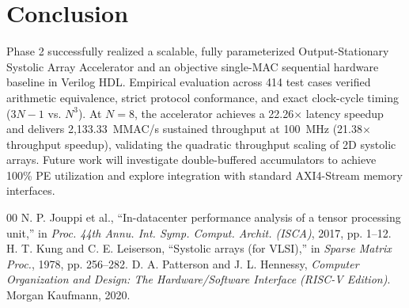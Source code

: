 \documentclass[conference]{IEEEtran}
\begin{document}
\section{Conclusion}
Phase 2 successfully realized a scalable, fully parameterized Output-Stationary Systolic Array Accelerator and an objective single-MAC sequential hardware baseline in Verilog HDL. Empirical evaluation across 414 test cases verified arithmetic equivalence, strict protocol conformance, and exact clock-cycle timing ($3N-1$ vs. $N^3$). At $N=8$, the accelerator achieves a 22.26$\times$ latency speedup and delivers 2,133.33~MMAC/s sustained throughput at 100~MHz (21.38$\times$ throughput speedup), validating the quadratic throughput scaling of 2D systolic arrays. Future work will investigate double-buffered accumulators to achieve 100\% PE utilization and explore integration with standard AXI4-Stream memory interfaces.

\begin{thebibliography}{00}
 N. P. Jouppi et al., ``In-datacenter performance analysis of a tensor processing unit,'' in \emph{Proc. 44th Annu. Int. Symp. Comput. Archit. (ISCA)}, 2017, pp. 1--12.
 H. T. Kung and C. E. Leiserson, ``Systolic arrays (for VLSI),'' in \emph{Sparse Matrix Proc.}, 1978, pp. 256--282.
 D. A. Patterson and J. L. Hennessy, \emph{Computer Organization and Design: The Hardware/Software Interface (RISC-V Edition)}. Morgan Kaufmann, 2020.
\end{thebibliography}
\end{document}
